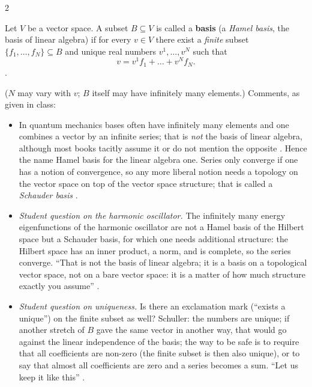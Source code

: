 \begin{paracol}{2}
\begin{definition}\label{def:c03-basis}
Let $V$ be a vector space. A subset $B\subseteq V$ is called a \textbf{basis} (a \emph{Hamel basis}, the basis of linear algebra) if for every $v\in V$ there exist a \emph{finite} subset $\{f_1,\dots,f_N\}\subseteq B$ and unique real numbers $v^1,\dots,v^N$ such that
\[
  v=v^1f_1+\dots+v^Nf_N.
\]
.
\end{definition}
($N$ may vary with $v$; $B$ itself may have infinitely many elements.)
Comments, as given in class:
\begin{itemize}
  \item In quantum mechanics bases often have infinitely many elements and one combines a vector by an infinite series; that is \emph{not} the basis of linear algebra, although most books tacitly assume it or do not mention the opposite
        . Hence the name Hamel basis for the linear algebra one. Series only converge if one has a notion of convergence, so any more liberal notion needs a topology on the vector space on top of the vector space structure; that is called a \emph{Schauder basis}
        .
  \item \emph{Student question on the harmonic oscillator.} The infinitely many energy eigenfunctions of the harmonic oscillator are not a Hamel basis of the Hilbert space but a Schauder basis, for which one needs additional structure: the Hilbert space has an inner product, a norm, and is complete, so the series converge.
        ``That is not the basis of linear algebra; it is a basis on a topological vector space, not on a bare vector space: it is a matter of how much structure exactly you assume'' .
  \item \emph{Student question on uniqueness.} Is there an exclamation mark (``exists a unique'') on the finite subset as well? Schuller: the numbers are unique; if another stretch of $B$ gave the same vector in another way, that would go against the linear independence of the basis; the way to be safe is to require that all
        coefficients are non-zero (the finite subset is then also unique), or to say that almost all coefficients are zero and a series becomes a sum. ``Let us keep it like this'' .
\end{itemize}


\end{paracol}
